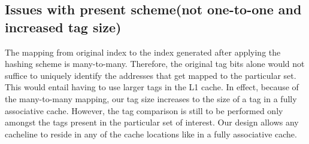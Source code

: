 \subsection{Issues with present scheme(not one-to-one and increased tag size)}
The mapping from original index to the index generated after applying the hashing scheme is many-to-many. Therefore, the original tag bits alone would not suffice to uniquely identify the addresses that get mapped to the particular set. This would entail having to use larger tags in the L1 cache. In effect, because of the many-to-many mapping, our tag size increases to the size of a tag in a fully associative cache. However, the tag comparison is still to be performed only amongst the tags present in the particular set of interest. Our design allows any cacheline to reside in any of the cache locations like in a fully associative cache.  

